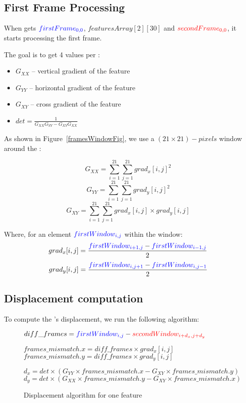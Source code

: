 \subsection{First Frame Processing}\label{gradientProcessing}

When \vc{} gets $\textcolor{blue}{firstFrame_{0,0}}$,  $featuresArray[2][30]$ and $\textcolor{red}{secondFrame_{0,0}}$, it starts processing the first frame.

The goal is to get 4 values per \feat{}:
\begin{itemize}
	\item $G_{XX}$ -- vertical gradient of the feature
	\item $G_{YY}$ -- horizontal gradient of the feature
	\item $G_{XY}$ -- cross gradient of the feature
	\item $det = \frac{1}{G_{XX}G_{YY}-G_{XY}G_{XX}}$
\end{itemize}

As shown in Figure~\ref{framesWindowFig}, we use a $(21\times21)-pixels$ window around the \feat{}:

$$G_{XX} = \sum_{i=1}^{21}\sum_{j=1}^{21} grad_{x}[i,j]^{2}$$
$$G_{YY} = \sum_{i=1}^{21}\sum_{j=1}^{21} grad_{y}[i,j]^{2}$$
$$G_{XY} = \sum_{i=1}^{21}\sum_{j=1}^{21} grad_{x}[i,j]\times grad_{y}[i,j]$$

Where, for an element $\textcolor{blue}{firstWindow_{i,j}}$ within the window:
$$grad_{x}[i,j] = \frac{\textcolor{blue}{firstWindow_{i+1,j}} - \textcolor{blue}{firstWindow_{i-1,j}}}{2}$$
$$grad_{y}[i,j] = \frac{\textcolor{blue}{firstWindow_{i,j+1}} - \textcolor{blue}{firstWindow_{i,j-1}}}{2}$$
\newpage


\subsection{Displacement computation}\label{dispComp}

To compute the \feat{}'s displacement, we run the following algorithm:

\begin{figure}[!htbp]
\begin{mdframed}
\begin{algorithmic}

	\State $diff\_frames = \textcolor{blue}{firstWindow_{i,j}} - \textcolor{red}{secondWindow_{i+d_{x},j+d_{y}}}$

	\State $frames\_mismatch.x = diff\_frames\times grad_{x}[i,j]$
	\State $frames\_mismatch.y = diff\_frames\times grad_{y}[i,j]$

	\EndFor

	\State $d_{x} = det\times (G_{YY}\times frames\_mismatch.x - G_{XY}\times frames\_mismatch.y)$
	\State $d_{y} = det\times (G_{XX}\times frames\_mismatch.y - G_{XY}\times frames\_mismatch.x)$
\end{algorithmic}
\end{mdframed}
\caption{Displacement algorithm for one feature}
\label{algoFig}
\end{figure}
\FloatBarrier

